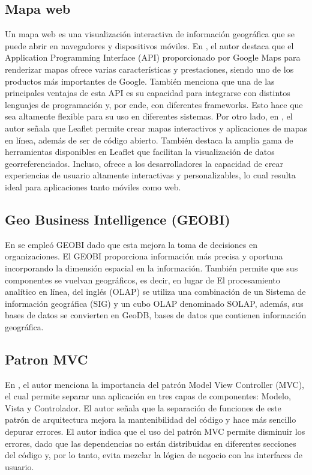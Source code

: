 \subsection{Mapa web}
Un mapa web es una visualización interactiva de información geográfica que se puede abrir en navegadores y dispositivos móviles.
En \cite{botto-tobarAppliedTechnologiesSecond2021}, el autor destaca que el Application Programming Interface (API) proporcionado por Google Maps para renderizar
mapas ofrece varias características y prestaciones, siendo uno de los productos más importantes de Google. También menciona que
una de las principales ventajas de esta API es su capacidad para integrarse con distintos lenguajes de programación y, por ende,
con diferentes frameworks. Esto hace que sea altamente flexible para su uso en diferentes sistemas. Por otro lado, en
\cite{cantilloAplicativoMovilPara}, el autor señala que Leaflet permite crear mapas interactivos y aplicaciones de
mapas en línea, además de ser de código abierto. También destaca la amplia gama de herramientas disponibles en Leaflet que
facilitan la visualización de datos georreferenciados. Incluso, ofrece a los desarrolladores la capacidad de crear experiencias
de usuario altamente interactivas y personalizables, lo cual resulta ideal para aplicaciones tanto móviles como web.

\subsection{Geo Business Intelligence (GEOBI)}
En \cite{herreraGeoBIBigVGI2015} se empleó GEOBI dado que esta mejora la toma de decisiones en organizaciones. El
GEOBI proporciona información más precisa y oportuna incorporando la dimensión espacial en la información. También
permite que sus componentes se vuelvan geográficos, es decir, en lugar de El procesamiento analítico en línea, del inglés
(OLAP) se utiliza una combinación de un Sistema de información geográfica (SIG) y un cubo OLAP denominado SOLAP, además,
sus bases de datos se convierten en GeoDB, bases de datos que contienen información geográfica.

\subsection{Patron MVC}
En \cite{lesanoperezAplicativoMovilGeoubicacion2022}, el autor menciona la importancia del patrón Model View Controller
(MVC), el cual permite separar una aplicación en tres capas de componentes: Modelo, Vista y Controlador. El autor señala que
la separación de funciones de este patrón de arquitectura mejora la mantenibilidad del código y hace más sencillo depurar
errores. El autor indica que el uso del patrón MVC permite disminuir los errores, dado que las dependencias no están
distribuidas en diferentes secciones del código y, por lo tanto, evita mezclar la lógica de negocio con las interfaces
de usuario.


